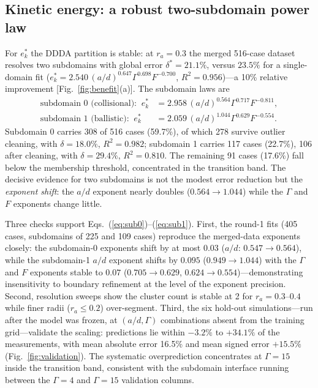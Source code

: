\documentclass[aps,pre,twocolumn,superscriptaddress,floatfix]{revtex4-2}
\begin{document}
\subsection{Kinetic energy: a robust two-subdomain power law}
\label{sec:ek}
For $e_k^*$ the DDDA partition is stable: at $r_a=0.3$ the merged 516-case dataset resolves two subdomains with global error $\delta^*=21.1\%$, versus $23.5\%$ for a single-domain fit ($e_k^*=2.540\,(a/d)^{0.647}\Gamma^{0.698}F^{-0.700}$, $R^2=0.956$)---a 10\% relative improvement [Fig.~\ref{fig:benefit}(a)]. The subdomain laws are
\begin{align}
\text{subdomain 0 (collisional):}\;\; e_k^*&=2.958\,(a/d)^{0.564}\Gamma^{0.717}F^{-0.811},\label{eq:sub0}\\
\text{subdomain 1 (ballistic):}\;\; e_k^*&=2.059\,(a/d)^{1.044}\Gamma^{0.629}F^{-0.554}.\label{eq:sub1}
\end{align}
Subdomain 0 carries 308 of 516 cases (59.7\%), of which 278 survive outlier cleaning, with $\delta=18.0\%$, $R^2=0.982$; subdomain 1 carries 117 cases (22.7\%), 106 after cleaning, with $\delta=29.4\%$, $R^2=0.810$. The remaining 91 cases (17.6\%) fall below the membership threshold, concentrated in the transition band. The decisive evidence for two subdomains is not the modest error reduction but the \emph{exponent shift}: the $a/d$ exponent nearly doubles ($0.564\to1.044$) while the $\Gamma$ and $F$ exponents change little.

Three checks support Eqs.~(\ref{eq:sub0})--(\ref{eq:sub1}). First, the round-1 fits (405 cases, subdomains of 225 and 109 cases) reproduce the merged-data exponents closely: the subdomain-0 exponents shift by at most $0.03$ ($a/d$: $0.547\to0.564$), while the subdomain-1 $a/d$ exponent shifts by $0.095$ ($0.949\to1.044$) with the $\Gamma$ and $F$ exponents stable to $0.07$ ($0.705\to0.629$, $0.624\to0.554$)---demonstrating insensitivity to boundary refinement at the level of the exponent precision. Second, resolution sweeps show the cluster count is stable at 2 for $r_a=0.3$--$0.4$ while finer radii ($r_a\le0.2$) over-segment. Third, the six hold-out simulations---run after the model was frozen, at $(a/d,\Gamma)$ combinations absent from the training grid---validate the scaling: predictions lie within $-3.2\%$ to $+34.1\%$ of the measurements, with mean absolute error 16.5\% and mean signed error $+15.5\%$ (Fig.~\ref{fig:validation}). The systematic overprediction concentrates at $\Gamma=15$ inside the transition band, consistent with the subdomain interface running between the $\Gamma=4$ and $\Gamma=15$ validation columns.
\end{document}
